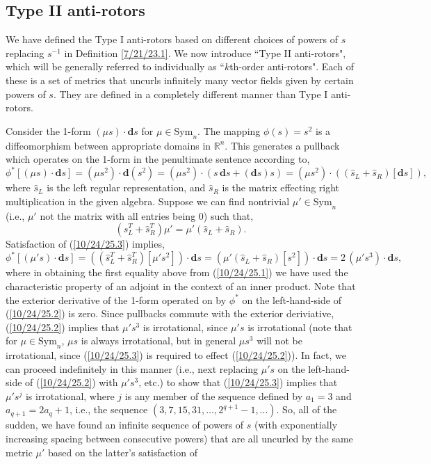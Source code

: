 \documentclass{amsart}
\theoremstyle{definition}
\numberwithin{theorem}{section}
\numberwithin{equation}{section}
\begin{document}
\subsection{Type II anti-rotors}
We have defined the Type I anti-rotors based on different choices of powers of $s$ replacing $s^{-1}$ in Definition \ref{7/21/23.1}.  We now introduce ``Type II anti-rotors", which will be generally referred to individually as ``$k$th-order anti-rotors".  Each of these is a set of metrics that uncurls infinitely many vector fields given by certain powers of $s$.  They are defined in a completely different manner than Type I anti-rotors.
   
Consider the 1-form $(\mu s)\cdot \mathbf{d}s$ for $\mu\in \text{Sym}_n$.    The mapping $\phi(s) = s^2$ is a diffeomorphism between appropriate domains in $\mathbb{R}^n$.  This generates a pullback which operates on the 1-form in the penultimate sentence according to, \begin{equation}\label{10/24/25.1} \phi^* \left[(\mu s)\cdot\mathbf{d}s\right] =  (\mu s^2)\cdot \mathbf{d}(s^2) = (\mu s^2)\cdot (s\,\mathbf{d}s + (\mathbf{d}s)s) = (\mu s^2)\cdot ((\hat{s}_L+\hat{s}_R)[\mathbf{d}s]),\end{equation} where $\hat{s}_L$ is the left regular representation, and $\hat{s}_R$ is the matrix effecting right multiplication in the given algebra.  Suppose we can find nontrivial $\mu'\in \text{Sym}_n$ (i.e., $\mu'$ not the matrix with all entries being 0) such that, \begin{equation}\label{10/24/25.3}(\hat{s}^T_L+\hat{s}_R^T)\mu' = \mu'(\hat{s}_L+\hat{s}_R).\end{equation}   Satisfaction of (\ref{10/24/25.3}) implies, \begin{equation}\label{10/24/25.2} \phi^* \left[(\mu' s)\cdot\mathbf{d}s\right]  =\left((\hat{s}^T_L+\hat{s}_R^T) [\mu' s^2]\right)\cdot\mathbf{d}s =  (\mu'(\hat{s}_L+\hat{s}_R)[s^2])\cdot\mathbf{d}s = 2\, (\mu' s^3) \cdot \mathbf{d}s,\end{equation}  where in obtaining the first equality above from (\ref{10/24/25.1}) we have used the characteristic property of an adjoint in the context of an inner product.  Note that the exterior derivative of the 1-form operated on by $\phi^*$ on the left-hand-side of (\ref{10/24/25.2}) is zero.  Since pullbacks commute with the exterior deriviative, (\ref{10/24/25.2}) implies that $\mu's^3$ is irrotational, since $\mu' s$ is irrotational (note that for $\mu\in \text{Sym}_n$, $\mu s$ is always irrotational, but in general $\mu s^3$ will not be irrotational, since (\ref{10/24/25.3}) is required to effect (\ref{10/24/25.2})).  In fact, we can proceed indefinitely in this manner (i.e., next replacing $\mu' s$ on the left-hand-side of (\ref{10/24/25.2}) with $\mu' s^3$, etc.) to show that (\ref{10/24/25.3}) implies that $\mu's^j$ is irrotational, where $j$ is any member of the sequence defined by $a_1=3$ and $a_{q+1} = 2a_q +1$, i.e., the sequence $(3, 7, 15, 31, \dots, 2^{q+1} -1,\dots)$.  So, all of the sudden, we have found an infinite sequence of powers of $s$ (with exponentially increasing spacing between consecutive powers) that are all uncurled by the same metric $\mu'$ based on the latter's satisfaction of 
\end{document}
